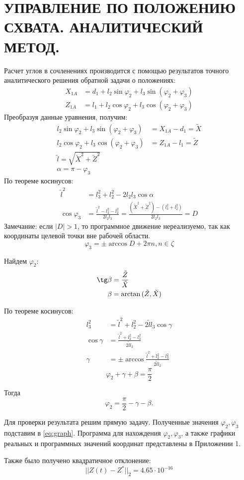 \chapter{\MakeUppercase{Управление по положению схвата. Аналитический метод. }}

Расчет углов в сочленениях производится с помощью результатов точного аналитического решения обратной задачи о положениях:
\begin{align*}
    X_{1A}&=d_1+l_2\sin\varphi_2+l_3\sin{(\varphi_2+\varphi_3)} \\
   Z_{1A}&=l_1+l_2\cos\varphi_2+l_3\cos{(\varphi_2+\varphi_3)} \label{eq:graph} \tag{1}
\end{align*}
Преобразуя данные уравнения, получим:
\begin{align*}
    l_2\sin\varphi_2+l_3\sin{(\varphi_2+\varphi_3)}&=X_{1A}-d_1=\tilde X \\
   l_2\cos\varphi_2+l_3\cos{(\varphi_2+\varphi_3)}&=Z_{1A}-l_1=\tilde Z \\
   \tilde l=\sqrt{\tilde X^2+\tilde Z^2} \\
   \alpha=\pi-\varphi_3
\end{align*}
По теореме косинусов:
\begin{align*}
    \tilde l^2 &= l_3^2+l_2^2-2 l_2 l_3 \cos\alpha\\ 
     \cos\varphi_3 &= \frac{\tilde l^2-l_3^2-l_2^2}{2l_2l_3}=\frac{(\tilde X^2+\tilde Z^2)-(l_3^2+l_2^2)}{2l_2l_3}=D
\end{align*}
Замечание: если $|D|>1$, то программное движение нереализуемо, так как координаты целевой точки вне рабочей области.
$$\varphi_3=\pm \arccos{D+2\pi n}, n\in\zeta$$

Найдем $\varphi_2$:
\begin{align*}
\tg\beta&=\frac{\tilde Z}{\tilde X} \\
\beta&=\arctan{(\tilde Z,\tilde X)}
\end{align*}

По теореме косинусов:
\begin{align*}
    l_3^2 &= \tilde l^2+l_2^2-2\tilde l l_3 \cos\gamma \\
    \cos\gamma &= \frac{\tilde l^2+l_2^2-l_3^2}{2\tilde l l_2} \\
    \gamma &=\pm \arccos\frac{\tilde l^2+l_2^2-l_3^2}{2\tilde l l_2}
\end{align*}
$$\varphi_2+\gamma+\beta=\frac\pi 2$$ 

Тогда $$\varphi_2=\frac \pi 2 -\gamma-\beta.$$

Для проверки результата решим прямую задачу. Полученные значения $\varphi_2,\varphi_3$ подставим в \eqref{eq:graph}. Программа для нахождения $\varphi_2,\varphi_3$, а также графики реальных и программных значений координат представлены в Приложении 1.

Также было получено квадратичное отклонение: $$||Z(t)-Z^*||_2=4.65\cdot10^{-16}$$
